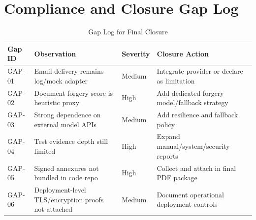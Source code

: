 \chapter{Compliance and Closure Gap Log}
\label{app:gap-log}

\begin{longtable}{p{1.8cm}p{6.0cm}p{2.3cm}p{4.3cm}}
\caption{Gap Log for Final Closure}\\
\toprule
Gap ID & Observation & Severity & Closure Action \\
\midrule
GAP-01 & Email delivery remains log/mock adapter & Medium & Integrate provider or declare as limitation \\
GAP-02 & Document forgery score is heuristic proxy & High & Add dedicated forgery model/fallback strategy \\
GAP-03 & Strong dependence on external model APIs & Medium & Add resilience and fallback policy \\
GAP-04 & Test evidence depth still limited & High & Expand manual/system/security reports \\
GAP-05 & Signed annexures not bundled in code repo & High & Collect and attach in final PDF package \\
GAP-06 & Deployment-level TLS/encryption proofs not attached & Medium & Document operational deployment controls \\
\bottomrule
\end{longtable}
